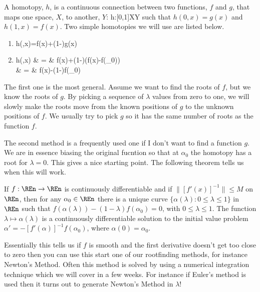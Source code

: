 A homotopy, $h$, is a continuous connection between two functions, $f$ and
$g$, that maps one space, $X$, to another, $Y$:
\beqn
h:[0,1]\times X\rightarrow Y
\eeqn
such that $h(0,x)=g(x)$ and $h(1,x)=f(x)$.  Two simple homotopies we will
use are listed below.
\begin{enumerate}
\item
\beqn
h(\lambda,x)=\lambda f(x)+(1-\lambda)g(x)
\eeqn
\item
\beqn
h(\lambda,x) & = & \lambda f(x)+(1-\lambda)(f(x)-f(\alpha_{0})) \\
             & = & f(x)-(1-\lambda)f(\alpha_{0})
\eeqn
\end{enumerate}
The first one is the most general.  Assume we want to find the roots
of $f$, but we know the roots of $g$.  By picking a sequence of
$\lambda$ values from zero to one, we will slowly make the roots move
from the known positions of $g$ to the unknown positions of $f$.  We
usually try to pick $g$ so it has the same number of roots as the
function $f$.

The second method is a frequently used one if I don't want to find a
function $g$.  We are in essence biasing the original fucntion so that
at $\alpha_{0}$ the homotopy has a root for $\lambda=0$.  This gives a nice
starting point.  The following theorem tells us when this will work.

\begin{theorem}
If $f:\REn\rightarrow\REn$ is continuously differentiable and if
$\|[f'(x)]^{-1}\|\leq M$ on $\REn$, then for any $\alpha_{0}\in\REn$ there
is a unique curve $\{\alpha(\lambda):0\leq\lambda\leq 1\}$ in $\REn$ such
that $f(\alpha(\lambda))-(1-\lambda)f(\alpha_{0})=0$, with $0\leq\lambda\leq
1$.  The function $\lambda\mapsto \alpha(\lambda)$ is a continuously
differentiable solution to the initial value problem
$\alpha'=-[f'(\alpha)]^{-1}f(\alpha_{0})$, where $\alpha(0)=\alpha_{0}$.
\end{theorem}

Essentially this tells us if $f$ is smooth and the first derivative
doesn't get too close to zero then you can use this start one of our
rootfinding methods, for instance Newton's Method.  Often this method
is solved by using a numerical integration technique which we will
cover in a few weeks.  For instance if Euler's method is used then it
turns out to generate Newton's Method in $\lambda$!


